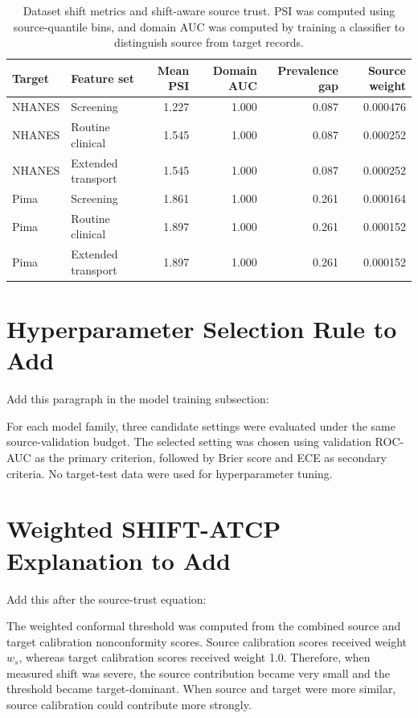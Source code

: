 \documentclass[11pt]{article}
\begin{document}
\begin{table}[!t]
\centering
\caption{Dataset shift metrics and shift-aware source trust. PSI was computed using source-quantile bins, and domain AUC was computed by training a classifier to distinguish source from target records.}
\label{tab:source_trust_insert}
\begin{tabular}{llrrrr}
\toprule
Target & Feature set & Mean PSI & Domain AUC & Prevalence gap & Source weight \\
\midrule
NHANES & Screening & 1.227 & 1.000 & 0.087 & 0.000476 \\
NHANES & Routine clinical & 1.545 & 1.000 & 0.087 & 0.000252 \\
NHANES & Extended transport & 1.545 & 1.000 & 0.087 & 0.000252 \\
Pima & Screening & 1.861 & 1.000 & 0.261 & 0.000164 \\
Pima & Routine clinical & 1.897 & 1.000 & 0.261 & 0.000152 \\
Pima & Extended transport & 1.897 & 1.000 & 0.261 & 0.000152 \\
\bottomrule
\end{tabular}
\end{table}

\section{Hyperparameter Selection Rule to Add}
Add this paragraph in the model training subsection:

For each model family, three candidate settings were evaluated under the same source-validation budget. The selected setting was chosen using validation ROC-AUC as the primary criterion, followed by Brier score and ECE as secondary criteria. No target-test data were used for hyperparameter tuning.

\section{Weighted SHIFT-ATCP Explanation to Add}
Add this after the source-trust equation:

The weighted conformal threshold was computed from the combined source and target calibration nonconformity scores. Source calibration scores received weight $w_s$, whereas target calibration scores received weight 1.0. Therefore, when measured shift was severe, the source contribution became very small and the threshold became target-dominant. When source and target were more similar, source calibration could contribute more strongly.
\end{document}

